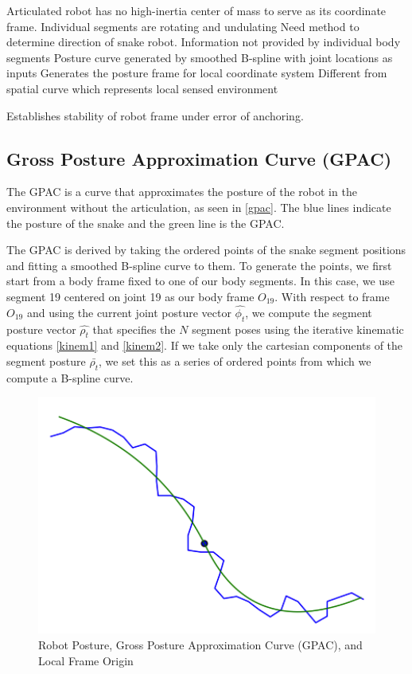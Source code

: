Articulated robot has no high-inertia center of mass to serve as its coordinate frame.
Individual segments are rotating and undulating
Need method to determine direction of snake robot.
Information not provided by individual body segments
Posture curve generated by smoothed B-spline with joint locations as inputs
Generates the posture frame for local coordinate system
Different from spatial curve which represents local sensed environment 

Establishes stability of robot frame under error of anchoring.

\subsection{Gross Posture Approximation Curve (GPAC)}
\label{grosspostureapproximationcurvegpac}

The GPAC is a curve that approximates the posture of the robot in the environment without the articulation, as seen in \autoref{gpac}. The blue lines indicate the posture of the snake and the green line is the GPAC.

The GPAC is derived by taking the ordered points of the snake segment positions and fitting a smoothed B-spline curve to them. To generate the points, we first start from a body frame fixed to one of our body segments. In this case, we use segment 19 centered on joint 19 as our body frame $O_{19}$. With respect to frame $O_{19}$ and using the current joint posture vector $\hat{\phi_t}$, we compute the segment posture vector $\hat{\rho_t}$ that specifies the $N$ segment poses using the iterative kinematic equations \autoref{kinem1} and \autoref{kinem2}. If we take only the cartesian components of the segment posture $\bar{\rho_t}$, we set this as a series of ordered points from which we compute a B-spline curve.

\begin{figure}[htbp]
\centering
\includegraphics[keepaspectratio,width=400pt,height=0.75\textheight]{plotGPAC0059.png}
\caption{Robot Posture, Gross Posture Approximation Curve (GPAC), and Local Frame Origin}
\label{gpac}
\end{figure}



